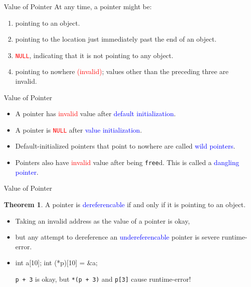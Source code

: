 \documentclass[handout]{beamer}
\newcommand{\red}[1]{\textcolor{red}{#1}}
\newcommand{\blue}[1]{\textcolor{blue}{#1}}
\newcommand{\ttt}[1]{\texttt{#1}}
\newcommand{\redtt}[1]{\red{\ttt{#1}}}
\theoremstyle{definition}
\newtheorem{thm}{Theorem}
\begin{document}
\begin{frame}{Value of Pointer}
    At any time, a pointer might be:
    \begin{enumerate}
        \item pointing to an object.
        \item pointing to the location just immediately past the end of an object.
        \item \redtt{NULL}, indicating that it is not pointing to any object.
        \item pointing to nowhere \red{(invalid)}; values other than the preceding three are invalid.
    \end{enumerate}
\end{frame}

\begin{frame}{Value of Pointer}
    \begin{itemize}
        \item A pointer has \red{invalid} value after \blue{default initialization}.
        \item A pointer is \redtt{NULL} after \blue{value initialization}.
        \pause
        \item Default-initialized pointers that point to nowhere are called \blue{wild pointers}.
        \item Pointers also have \red{invalid} value after being \ttt{free}d. This is called a \blue{dangling pointer}.
    \end{itemize}
\end{frame}

\begin{frame}[fragile]{Value of Pointer}
    \begin{thm}
        A pointer is \blue{dereferencable} if and only if it is pointing to an object.
    \end{thm}
    \begin{itemize}
        \item Taking an invalid address as the value of a pointer is okay,
        \item but any attempt to dereference an \blue{undereferencable} pointer is severe runtime-error.
        \pause
        \item \begin{cpp}
int a[10];
int (*p)[10] = &a;
        \end{cpp}
        \ttt{p + 3} is okay, but \ttt{*(p + 3)} and \ttt{p[3]} cause runtime-error!
    \end{itemize}
\end{frame}
\end{document}
